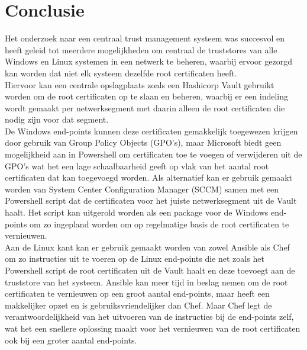 
\chapter{Conclusie}%
\label{ch:conclusie}



Het onderzoek naar een centraal trust management systeem was succesvol en heeft geleid tot meerdere mogelijkheden om centraal de truststores van alle Windows en Linux systemen in een netwerk te beheren, waarbij ervoor gezorgd kan worden dat niet elk systeem dezelfde root certificaten heeft. \\

Hiervoor kan een centrale opslagplaats zoals een Hashicorp Vault gebruikt worden om de root certificaten op te slaan en beheren, waarbij er een indeling wordt gemaakt per netwerksegment met daarin alleen de root certificaten die nodig zijn voor dat segment. \\

De Windows end-points kunnen deze certificaten gemakkelijk toegewezen krijgen door gebruik van Group Policy Objects (GPO's), maar Microsoft biedt geen mogelijkheid aan in Powershell om certificaten toe te voegen of verwijderen uit de GPO's wat het een lage schaalbaarheid geeft op vlak van het aantal root certificaten dat kan toegevoegd worden.
Als alternatief kan er gebruik gemaakt worden van System Center Configuration Manager (SCCM) samen met een Powershell script dat de certificaten voor het juiste netwerksegment uit de Vault haalt. Het script kan uitgerold worden als een package voor de Windows end-points om zo ingepland worden om op regelmatige basis de root certificaten te vernieuwen. \\

Aan de Linux kant kan er gebruik gemaakt worden van zowel Ansible als Chef om zo instructies uit te voeren op de Linux end-points die net zoals het Powershell script de root certificaten uit de Vault haalt en deze toevoegt aan de truststore van het systeem. 
Ansible kan meer tijd in beslag nemen om de root certificaten te vernieuwen op een groot aantal end-points, maar heeft een makkelijker opzet en is gebruiksvriendelijker dan Chef. 
Maar Chef legt de verantwoordelijkheid van het uitvoeren van de instructies bij de end-points zelf, wat het een snellere oplossing maakt voor het vernieuwen van de root certificaten ook bij een groter aantal end-points. \\

